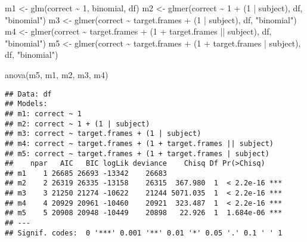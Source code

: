 \documentclass[
]{article}
\newenvironment{Shaded}{\begin{snugshade}}{\end{snugshade}}
\newcommand{\DecValTok}[1]{\textcolor[rgb]{0.00,0.00,0.81}{#1}}
\newcommand{\FunctionTok}[1]{\textcolor[rgb]{0.00,0.00,0.00}{#1}}
\newcommand{\NormalTok}[1]{#1}
\newcommand{\OtherTok}[1]{\textcolor[rgb]{0.56,0.35,0.01}{#1}}
\newcommand{\SpecialCharTok}[1]{\textcolor[rgb]{0.00,0.00,0.00}{#1}}
\newcommand{\StringTok}[1]{\textcolor[rgb]{0.31,0.60,0.02}{#1}}
\begin{document}
\begin{Shaded}
\begin{Highlighting}[]
\NormalTok{m1 }\OtherTok{\textless{}{-}} \FunctionTok{glm}\NormalTok{(correct }\SpecialCharTok{\textasciitilde{}} \DecValTok{1}\NormalTok{, }\StringTok{\textquotesingle{}binomial\textquotesingle{}}\NormalTok{, df)}
\NormalTok{m2 }\OtherTok{\textless{}{-}} \FunctionTok{glmer}\NormalTok{(correct }\SpecialCharTok{\textasciitilde{}} \DecValTok{1} \SpecialCharTok{+}\NormalTok{ (}\DecValTok{1} \SpecialCharTok{|}\NormalTok{ subject), df, }\StringTok{"binomial"}\NormalTok{)}
\NormalTok{m3 }\OtherTok{\textless{}{-}} \FunctionTok{glmer}\NormalTok{(correct }\SpecialCharTok{\textasciitilde{}}\NormalTok{ target.frames }\SpecialCharTok{+}\NormalTok{ (}\DecValTok{1} \SpecialCharTok{|}\NormalTok{ subject), df, }\StringTok{"binomial"}\NormalTok{)}
\NormalTok{m4 }\OtherTok{\textless{}{-}} \FunctionTok{glmer}\NormalTok{(correct }\SpecialCharTok{\textasciitilde{}}\NormalTok{ target.frames }\SpecialCharTok{+}\NormalTok{ (}\DecValTok{1} \SpecialCharTok{+}\NormalTok{ target.frames }\SpecialCharTok{||}\NormalTok{ subject), df, }\StringTok{"binomial"}\NormalTok{)}
\NormalTok{m5 }\OtherTok{\textless{}{-}} \FunctionTok{glmer}\NormalTok{(correct }\SpecialCharTok{\textasciitilde{}}\NormalTok{ target.frames }\SpecialCharTok{+}\NormalTok{ (}\DecValTok{1} \SpecialCharTok{+}\NormalTok{ target.frames }\SpecialCharTok{|}\NormalTok{ subject), df, }\StringTok{"binomial"}\NormalTok{)}

\FunctionTok{anova}\NormalTok{(m5, m1, m2, m3, m4)}
\end{Highlighting}
\end{Shaded}

\begin{verbatim}
## Data: df
## Models:
## m1: correct ~ 1
## m2: correct ~ 1 + (1 | subject)
## m3: correct ~ target.frames + (1 | subject)
## m4: correct ~ target.frames + (1 + target.frames || subject)
## m5: correct ~ target.frames + (1 + target.frames | subject)
##    npar   AIC   BIC logLik deviance    Chisq Df Pr(>Chisq)    
## m1    1 26685 26693 -13342    26683                           
## m2    2 26319 26335 -13158    26315  367.980  1  < 2.2e-16 ***
## m3    3 21250 21274 -10622    21244 5071.035  1  < 2.2e-16 ***
## m4    4 20929 20961 -10460    20921  323.487  1  < 2.2e-16 ***
## m5    5 20908 20948 -10449    20898   22.926  1  1.684e-06 ***
## ---
## Signif. codes:  0 '***' 0.001 '**' 0.01 '*' 0.05 '.' 0.1 ' ' 1
\end{verbatim}
\end{document}
